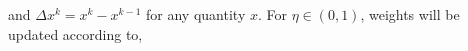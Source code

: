 \documentclass{jcmlatex}
\begin{document}
and $\Delta x^k =  x^k-x^{k-1}$ for any quantity $x$. For $\eta \in (0,1)$, weights will be updated according to,   %
\end{document}
